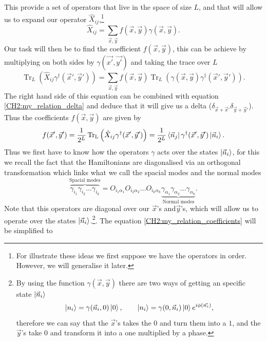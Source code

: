 \indent This provide a set of operators that live in the space of size $L$, and that will allow us to expand our operator $\hat{X}_{ij}$,\footnote{For illustrate these ideas we first suppose we have the operators in order. However, we will generalise it later.}
\begin{equation}
\hat{X}_{ij} = \sum_{\vec{x},\vec{y}} f(\vec{x},\vec{y})\gamma(\vec{x},\vec{y}).
\end{equation}
\indent Our task will then be to find the coefficient $f(\vec{x},\vec{y})$, this can be achieve by multiplying on both sides by $\gamma(\vec{x'},\vec{y'})$ and taking the trace over $L$
\begin{equation}
\operatorname{Tr}_L\left(\hat{X}_{ij}\gamma^{\dagger}(\vec{x}',\vec{y}')\right)=\sum_{\vec{x},\vec{y}}f(\vec{x},\vec{y}) \operatorname{Tr}_L\left(\gamma(\vec{x},\vec{y})\gamma^{\dagger}(\vec{x}',\vec{y}')\right).
\end{equation}
\indent The right hand side of this equation can be combined with equation \eqref{CH2:my_relation_delta} and deduce that it will give us a delta ($\delta_{\vec{x}+\vec{x}'}\delta_{\vec{y}+\vec{y}'}$). Thus the coefficients $f(\vec{x},\vec{y})$ are given by
\begin{equation}
f(\vec{x}',\vec{y}') = \frac{1}{2^L}\operatorname{Tr_L}\left(\hat{X}_{ij}\gamma^{\dagger}(\vec{x}',\vec{y}')\right)=\frac{1}{2^L} \mathinner{\langle{\vec{n}_j}|}\gamma^{\dagger}(\vec{x}',\vec{y}')\mathinner{|{\vec{n}_i}\rangle}.
\label{CH2:my_relation_coefficients}
\end{equation}
\indent Thus we first have to know how the operators $\gamma$ acts over the states $\mathinner{|{\vec{n}_i}\rangle}$, for this we recall the fact that the Hamiltonians are diagonalised via an orthogonal transformation which links what we call the spacial modes and the normal modes
\begin{equation}
\overbrace{\gamma_{i_1}\gamma_{i_2}\ldots\gamma_{i_k}}^{\text{Spacial modes}}= O_{i_1\alpha_1}O_{i_2\alpha_2}\ldots O_{i_k\alpha_k} \underbrace{\gamma_{\alpha_1}\gamma_{\alpha_2}\ldots\gamma_{\alpha_k}}_{\text{Normal modes}}.
\end{equation}
\indent Note that this operators are diagonal over our $\vec{x}$'s and$\vec{y}$'s, which will allow us to operate over the states $\mathinner{|{\vec{n}_i}\rangle}$.\footnote{By using the function $\gamma(\vec{x},\vec{y})$ there are two ways of getting an specific state $\mathinner{|{\vec{n}_i}\rangle}$
\begin{equation}
\mathinner{|{n_i}\rangle}=\gamma(\vec{n}_i,0)\mathinner{|{0}\rangle}, \qquad \mathinner{|{n_i}\rangle}=\gamma(0,\vec{n}_i)\mathinner{|{0}\rangle}e^{i\phi(\vec{n_i})},
\end{equation}
therefore we can say that the $\vec{x}$'s takes the $0$ and turn them into a $1$, and the $\vec{y}$'s take $0$ and transform it into a one multiplied by a phase.
}. The equation \eqref{CH2:my_relation_coefficients} will be simplified to
